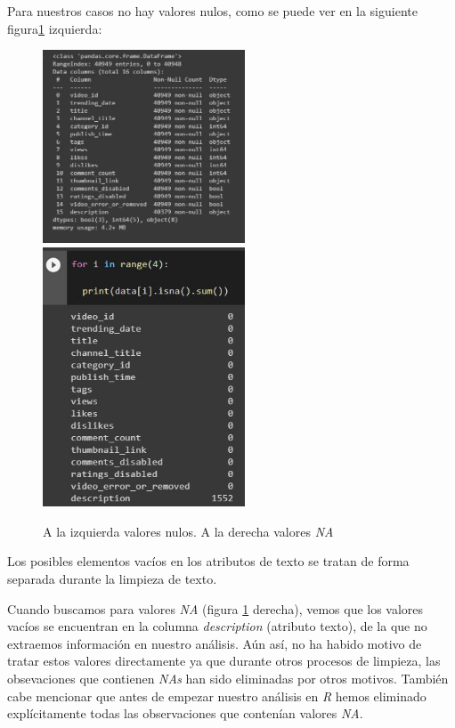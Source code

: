 \documentclass[a4paper,12pt]{article}
\begin{document}
Para nuestros casos no hay valores nulos, como se puede ver en la siguiente figura\ref{fig:nula} izquierda:

\begin{figure}[h!]
\centering
\includegraphics[width=6cm]{vacio_datos.JPG}
\includegraphics[width=6cm]{Na_values.JPG}
\caption{A la izquierda valores nulos. A la derecha valores {\itshape NA}}
\label{fig:nula}
\end{figure}

Los posibles elementos vac\'ios en los atributos de texto se tratan de forma separada durante la limpieza de texto.

Cuando buscamos para valores {\itshape NA} (figura \ref{fig:nula} derecha), vemos que los valores vac\'ios se encuentran en la columna {\itshape description} (atributo texto), de la que no extraemos informaci\'on en nuestro an\'alisis. A\'un as\'i, no ha habido motivo de tratar estos valores directamente ya que durante otros procesos de limpieza, las obsevaciones  que contienen {\itshape NAs} han sido eliminadas por otros motivos. Tambi\'en cabe mencionar que antes de empezar nuestro an\'alisis en {\itshape R} hemos eliminado expl\'icitamente todas las observaciones que conten\'ian valores {\itshape NA}.
\end{document}
